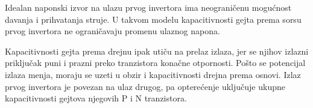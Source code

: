 Idealan naponski izvor na ulazu prvog invertora ima neograničenu mogućnost davanja i prihvatanja struje. U takvom modelu kapacitivnosti gejta prema sorsu prvog invertora ne ograničavaju promenu ulaznog napona.

Kapacitivnosti gejta prema drejnu ipak utiču na prelaz izlaza, jer se njihov izlazni priključak puni i prazni preko tranzistora konačne otpornosti. Pošto se potencijal izlaza menja, moraju se uzeti u obzir i kapacitivnosti drejna prema osnovi. Izlaz prvog invertora je povezan na ulaz drugog, pa opterećenje uključuje ukupne kapacitivnosti gejtova njegovih P i N tranzistora.
